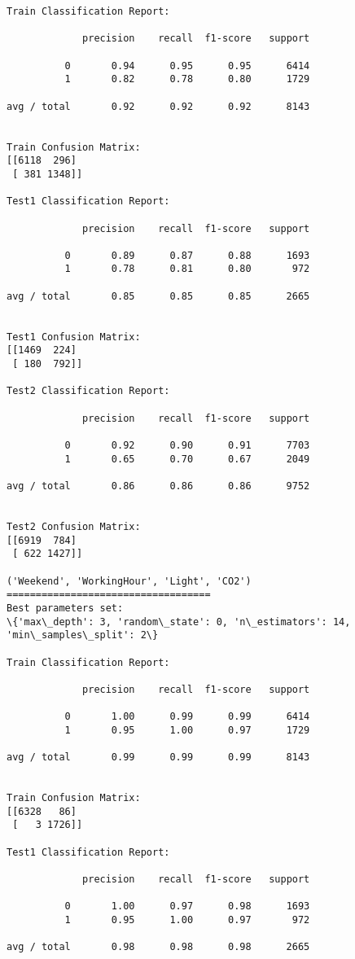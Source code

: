 \documentclass[11pt]{article}
\begin{document}
\begin{Verbatim}[commandchars=\\\{\}]
Train Classification Report:

             precision    recall  f1-score   support

          0       0.94      0.95      0.95      6414
          1       0.82      0.78      0.80      1729

avg / total       0.92      0.92      0.92      8143


Train Confusion Matrix:
[[6118  296]
 [ 381 1348]]

Test1 Classification Report:

             precision    recall  f1-score   support

          0       0.89      0.87      0.88      1693
          1       0.78      0.81      0.80       972

avg / total       0.85      0.85      0.85      2665


Test1 Confusion Matrix:
[[1469  224]
 [ 180  792]]

Test2 Classification Report:

             precision    recall  f1-score   support

          0       0.92      0.90      0.91      7703
          1       0.65      0.70      0.67      2049

avg / total       0.86      0.86      0.86      9752


Test2 Confusion Matrix:
[[6919  784]
 [ 622 1427]]

('Weekend', 'WorkingHour', 'Light', 'CO2')
===================================
Best parameters set:
\{'max\_depth': 3, 'random\_state': 0, 'n\_estimators': 14, 'min\_samples\_split': 2\}

Train Classification Report:

             precision    recall  f1-score   support

          0       1.00      0.99      0.99      6414
          1       0.95      1.00      0.97      1729

avg / total       0.99      0.99      0.99      8143


Train Confusion Matrix:
[[6328   86]
 [   3 1726]]

Test1 Classification Report:

             precision    recall  f1-score   support

          0       1.00      0.97      0.98      1693
          1       0.95      1.00      0.97       972

avg / total       0.98      0.98      0.98      2665



\end{Verbatim}
\end{document}
